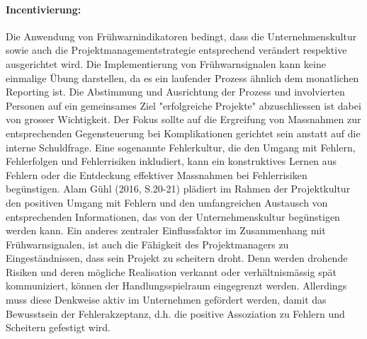 \paragraph{Incentivierung:} Die Anwendung von Frühwarnindikatoren bedingt, dass die Unternehmenskultur sowie auch die Projektmanagementstrategie entsprechend verändert respektive ausgerichtet wird. Die Implementierung von Frühwarnsignalen kann keine einmalige Übung darstellen, da es ein laufender Prozess ähnlich dem monatlichen Reporting ist. Die Abstimmung und Ausrichtung der Prozess und involvierten Personen auf ein gemeinsames Ziel "erfolgreiche Projekte" abzuschliessen ist dabei von grosser Wichtigkeit. Der Fokus sollte auf die Ergreifung von Massnahmen zur entsprechenden Gegensteuerung bei Komplikationen gerichtet sein anstatt auf die interne Schuldfrage. Eine sogenannte Fehlerkultur, die den Umgang mit Fehlern, Fehlerfolgen und Fehlerrisiken inkludiert, kann ein konstruktives Lernen aus Fehlern oder die Entdeckung effektiver Massnahmen bei Fehlerrisiken begünstigen. Alam Gühl (2016, S.20-21) plädiert im Rahmen der Projektkultur den positiven Umgang mit Fehlern und  den umfangreichen Austausch von entsprechenden Informationen, das von der Unternehmenskultur begünstigen werden kann. Ein anderes zentraler Einflussfaktor im Zusammenhang mit Frühwarnsignalen, ist auch die Fähigkeit des Projektmanagers zu Eingeständnissen, dass sein Projekt zu scheitern droht. Denn werden drohende Risiken und deren mögliche Realisation verkannt oder verhältnismässig spät kommuniziert, können der Handlungsspielraum eingegrenzt werden. Allerdings muss diese Denkweise aktiv im Unternehmen gefördert werden, damit das Bewusstsein der Fehlerakzeptanz, d.h. die positive Assoziation zu Fehlern und Scheitern gefestigt wird. 


 